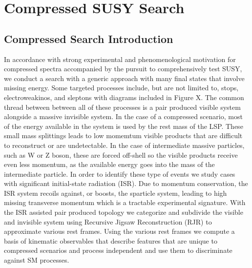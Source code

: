 
\setcounter{secnumdepth}{3}
\setcounter{tocdepth}{3}
\setlength{\parskip}{\smallskipamount}
\setlength{\parindent}{0pt}


\makeatletter


\providecommand{\tabularnewline}{\\}


\makeatother

%

\chapter{Compressed SUSY Search}


\section{Compressed Search Introduction}
In accordance with strong experimental and phenomenological motivation for compressed spectra accompanied by the pursuit to comprehensively test SUSY, we conduct a search with a generic approach with many final states that involve missing energy. Some targeted processes include, but are not limited to, stops, electroweakinos, and sleptons with diagrams included in Figure X.  The common thread between between all of these processes is a pair produced visible system alongside a massive invisible system. In the case of a compressed scenario, most of the energy available in the system is used by the rest mass of the LSP. These small mass splittings leads to low momemtum visible products that are difficult to reconstruct or are undetectable. In the case of intermediate massive particles, such as W or Z boson, these are forced off-shell so the visible products receive even less momentum, as the available energy goes into the mass of the intermediate particle. In order to identify these type of events we study cases with significant initial-state radiation (ISR). Due to momentum conservation, the ISR system recoils against, or boosts, the sparticle system, leading to high missing transverse momentum which is a tractable experimental signature. With the ISR assisted pair produced topology we categorize and subdivide the visible and invisible system using Recursive Jigsaw Reconstruction (RJR) to approximate various rest frames. Using the various rest frames we compute a basis of kinematic observables that describe features that are unique to compressed scenarios and process independent and use them to discriminate against SM processes.

